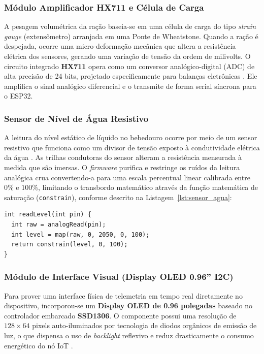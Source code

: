\documentclass[12pt]{article}\usepackage{sbc-template}\usepackage{graphicx,url}\usepackage[utf8]{inputenc}
\begin{document}
\subsubsection{Módulo Amplificador HX711 e Célula de Carga}
A pesagem volumétrica da ração baseia-se em uma célula de carga do tipo \textit{strain gauge} (extensômetro) arranjada em uma Ponte de Wheatstone. Quando a ração é despejada, ocorre uma micro-deformação mecânica que altera a resistência elétrica dos sensores, gerando uma variação de tensão da ordem de milivolts. O circuito integrado \textbf{HX711} opera como um conversor analógico-digital (ADC) de alta precisão de 24 bits, projetado especificamente para balanças eletrônicas \cite{avia:hx711}. Ele amplifica o sinal analógico diferencial e o transmite de forma serial síncrona para o ESP32.

\subsubsection{Sensor de Nível de Água Resistivo}
A leitura do nível estático de líquido no bebedouro ocorre por meio de um sensor resistivo que funciona como um divisor de tensão exposto à condutividade elétrica da água \cite{components101:water}. As trilhas condutoras do sensor alteram a resistência mensurada à medida que são imersas. O \textit{firmware} purifica e restringe os ruídos da leitura analógica crua convertendo-a para uma escala percentual linear calibrada entre $0\%$ e $100\%$, limitando o transbordo matemático através da função matemática de saturação (\lstinline$constrain$), conforme descrito na Listagem~\ref{lst:sensor_agua}:

\begin{lstlisting}[caption={Sub-rotina para leitura, mapeamento e restrição do percentual hidráulico.}, label={lst:sensor_agua}]
int readLevel(int pin) {
  int raw = analogRead(pin);
  int level = map(raw, 0, 2050, 0, 100);
  return constrain(level, 0, 100);
}
\end{lstlisting}

\subsubsection{Módulo de Interface Visual (Display OLED 0.96'' I2C)}
Para prover uma interface física de telemetria em tempo real diretamente no dispositivo, incorporou-se um \textbf{Display OLED de 0.96 polegadas} baseado no controlador embarcado \textbf{SSD1306}. O componente possui uma resolução de $128 \times 64$ pixels auto-iluminados por tecnologia de diodos orgânicos de emissão de luz, o que dispensa o uso de \textit{backlight} reflexivo e reduz drasticamente o consumo energético do nó IoT \cite{solomon:ssd1306}.
\end{document}
